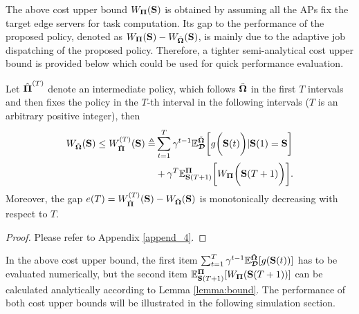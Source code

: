 The above cost upper bound $W_{\boldsymbol{\Pi}}(\mathbf{S})$ is obtained by assuming all the APs fix the target edge servers for task computation.
Its gap to the performance of the proposed policy, denoted as $W_{\boldsymbol{\Pi}}(\mathbf{S}) - W_{\tilde{\boldsymbol{\Omega}}}(\mathbf{S})$, is mainly due to the adaptive job dispatching of the proposed policy.
Therefore, a tighter semi-analytical cost upper bound is provided below which could be used for quick performance evaluation.
\begin{lemma}
    Let $\hat{\boldsymbol{\Pi}}^{(T)}$ denote an intermediate policy, which follows $\tilde{\boldsymbol{\Omega}}$ in the first $T$ intervals and then fixes the policy in the $T$-th interval in the following intervals ($T$ is an arbitrary positive integer), then
    {\small
    \begin{align}
        W_{\tilde{\boldsymbol{\Omega}}}(\mathbf{S}) \leq W_{\hat{\boldsymbol{\Pi}}}^{(T)}(\mathbf{S})
        \triangleq &\sum_{t=1}^{T} \gamma^{t-1} \mathbb{E}^{\tilde{\boldsymbol{\Omega}}}_{\boldsymbol{\mathcal{D}}}\bigg[g\bigg(\mathbf{S}(t)\bigg) | \mathbf{S}(1)=\mathbf{S}\bigg]
        \\\nonumber
        &+\gamma^{T} \mathbb{E}^{\boldsymbol{\Pi}}_{\mathbf{S}(T+1)}\bigg[W_{\boldsymbol{\Pi}}\bigg(\mathbf{S}(T+1)\bigg)\bigg].
        \label{eqn:semi-bound}
    \end{align}
    }%
    Moreover, the gap $e(T) = W^{(T)}_{\hat{\boldsymbol{\Pi}}}(\mathbf{S}) - W_{\tilde{\boldsymbol{\Omega}}}(\mathbf{S})$ is monotonically decreasing with respect to $T$.
    \label{lemma:semi-bound}
\end{lemma}
\begin{proof}
    Please refer to Appendix \ref{append_4}.
\end{proof}
In the above cost upper bound, the first item $\sum_{t=1}^{T} \gamma^{t-1} \mathbb{E}^{\tilde{\boldsymbol{\Omega}}}_{\boldsymbol{\mathcal{D}}}[g(\mathbf{S}(t))]$ has to be evaluated numerically, but the second item $\mathbb{E}^{\boldsymbol{\Pi}}_{\mathbf{S}(T+1)}[{W_{\boldsymbol{\Pi}}(\mathbf{S}(T+1))}]$ can be calculated analytically according to Lemma \ref{lemma:bound}.
The performance of both cost upper bounds will be illustrated in the following simulation section.


